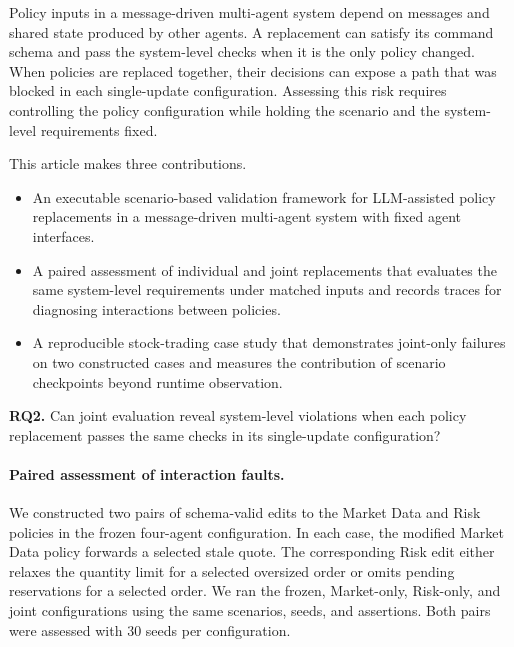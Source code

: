 
Policy inputs in a message-driven multi-agent system depend on messages
and shared state produced by other agents. A replacement can satisfy
its command schema and pass the system-level checks when it is the only
policy changed. When policies are replaced together, their decisions
can expose a path that was blocked in each single-update configuration.
Assessing this risk requires controlling the policy configuration while
holding the scenario and the system-level requirements fixed.

This article makes three contributions.
\begin{itemize}
  \item An executable scenario-based validation framework for
    LLM-assisted policy replacements in a message-driven multi-agent
    system with fixed agent interfaces.
  \item A paired assessment of individual and joint replacements that
    evaluates the same system-level requirements under matched inputs
    and records traces for diagnosing interactions between policies.
  \item A reproducible stock-trading case study that demonstrates
    joint-only failures on two constructed cases and measures the
    contribution of scenario checkpoints beyond runtime observation.
\end{itemize}

\textbf{RQ2.} Can joint evaluation reveal system-level violations
when each policy replacement passes the same checks in its
single-update configuration?

\paragraph{Paired assessment of interaction faults.}
We constructed two pairs of schema-valid edits to the Market Data
and Risk policies in the frozen four-agent configuration. In each
case, the modified Market Data policy forwards a selected stale quote.
The corresponding Risk edit either relaxes the quantity limit for a
selected oversized order or omits pending reservations for a selected
order. We ran the frozen, Market-only, Risk-only, and joint
configurations using the same scenarios, seeds, and assertions. Both
pairs were assessed with 30 seeds per configuration.


